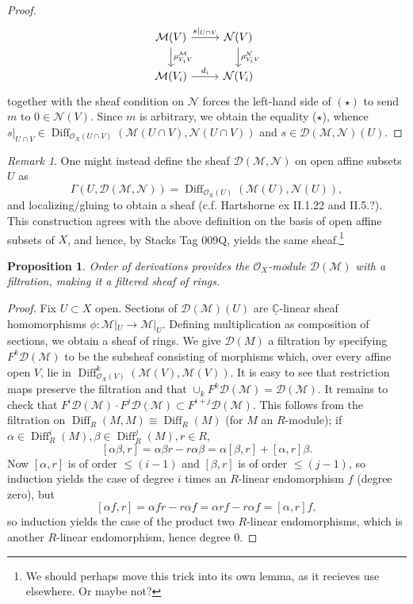 \documentclass{article}
\newcommand{\C}{\mathbb{C}}
\theoremstyle{plain}
\newtheorem{proposition}[theorem]{Proposition}
\theoremstyle{definition}
\theoremstyle{remark}
\newtheorem*{remark}{Remark}
\DeclareMathOperator{\Diff}{Diff}
\begin{document}
\begin{proof}
\begin{equation*}
\begin{tikzcd}
            \mathcal{M}(V)\ar{r}{s|_{U\cap V}}\ar{d}{\rho^\mathcal{M}_{V_iV}} & \mathcal{N}(V)\ar{d}{\rho^\mathcal{N}_{V_iV}}\\
            \mathcal{M}(V_i)\ar{r}{d_i} & \mathcal{N}(V_i)
        \end{tikzcd}
    \end{equation*}
    together with the sheaf condition on $\mathcal{N}$ forces the left-hand side of $(\star)$
    to send $m$ to $0\in\mathcal{N}(V).$ Since $m$ is arbitrary, we obtain the equality ($\star$),
    whence $s|_{U\cap V}\in\Diff_{\mathcal{O}_X(U\cap V)}(\mathcal{M}(U\cap V),\mathcal{N}(U\cap V))$
    and $s\in\mathcal{D}(\mathcal{M},\mathcal{N})(U)$.
\end{proof}

\begin{remark}
    One might instead define the sheaf $\mathcal{D}(\mathcal{M},\mathcal{N})$ on open affine subsets $U$ as
    \[\Gamma(U,\mathcal{D}(\mathcal{M},\mathcal{N}))=\Diff_{\mathcal{O}_X(U)}(\mathcal{M}(U),\mathcal{N}(U)),\]
    and localizing/gluing to obtain a sheaf (c.f. Hartshorne ex II.1.22 and II.5.?).
    This construction agrees with the above definition on the
    basis of open affine subsets of $X$, and hence, by Stacks Tag 009Q, yields the same sheaf.\footnote{We
    should perhaps move this trick into its own lemma, as it recieves use elsewhere. Or maybe not?}
\end{remark}

\begin{proposition}
    Order of derivations provides the $\mathcal{O}_X$-module $\mathcal{D}(\mathcal{M})$ with
    a filtration, making it a filtered sheaf of rings.
\end{proposition}
\begin{proof}
    Fix $U\subset X$ open. Sections of $\mathcal{D}(\mathcal{M})(U)$ are $\underline{\C}$-linear
    sheaf homomorphisms $\phi:\mathcal{M}|_U\to\mathcal{M}|_U$. Defining multiplication as composition
    of sections, we obtain a sheaf of rings. We give $\mathcal{D}(M)$ a filtration by specifying
    $F^k\mathcal{D}(\mathcal{M})$ to be the subsheaf consisting of morphisms which, over every affine
    open $V$, lie in $\Diff^k_{\mathcal{O}_X(V)}(\mathcal{M}(V),\mathcal{M}(V))$. It is easy to see
    that restriction maps preserve the filtration and that $\cup_kF^k\mathcal{D}(\mathcal{M})=\mathcal{D}(\mathcal{M})$.
    It remains to check that
    $F^i\mathcal{D}(\mathcal{M})\cdot F^j\mathcal{D}(\mathcal{M})\subset F^{i+j}\mathcal{D}(\mathcal{M})$.
    This follows from the filtration on $\Diff_R(M,M)\equiv\Diff_R(M)$ (for $M$ an $R$-module);
    if $\alpha\in\Diff^i_R(M),\beta\in\Diff^j_R(M),r\in R$,
    \[ [\alpha\beta,r] = \alpha\beta r-r\alpha\beta = \alpha[\beta,r] +[\alpha,r]\beta.  \]
    Now $[\alpha,r]$ is of order $\leqslant (i-1)$ and $[\beta,r]$ is of order $\leqslant(j-1)$, so induction
    yields the case of degree $i$ times an $R$-linear endomorphism $f$ (degree zero), but
    \[ [\alpha f, r]=\alpha fr-r\alpha f=\alpha rf-r\alpha f=[\alpha,r]f, \]
    so induction yields the case of the product two $R$-linear endomorphisms, which is another
    $R$-linear endomorphism, hence degree 0.
\end{proof}
\end{document}

